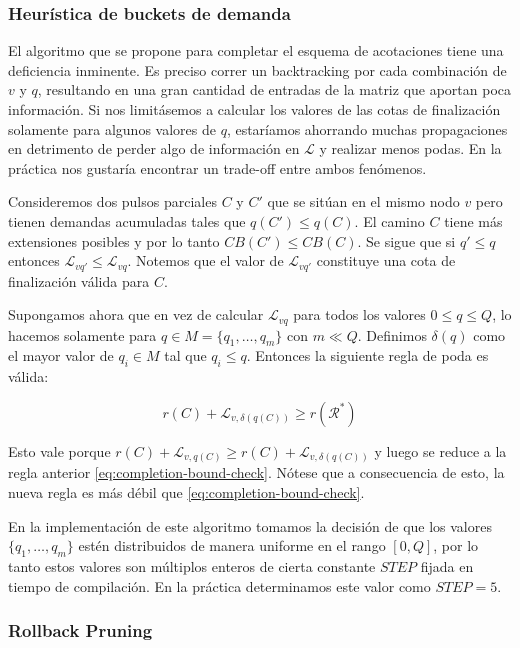 \subsubsection{Heurística de buckets de demanda}

El algoritmo que se propone para completar el esquema de acotaciones tiene una deficiencia inminente. Es preciso correr un backtracking por cada combinación de $v$ y $q$, resultando en una gran cantidad de entradas de la matriz que aportan poca información. Si nos limitásemos a calcular los valores de las cotas de finalización solamente para algunos valores de $q$, estaríamos ahorrando muchas propagaciones en detrimento de perder algo de información en $\mathscr{L}$ y realizar menos podas. En la práctica nos gustaría encontrar un trade-off entre ambos fenómenos.

Consideremos dos pulsos parciales $C$ y $C'$ que se sitúan en el mismo nodo $v$ pero tienen demandas acumuladas tales que $q(C') \leq q(C)$. El camino $C$ tiene más extensiones posibles y por lo tanto $CB(C') \leq CB(C)$. Se sigue que si $q' \leq q$ entonces $\mathscr{L}_{vq'} \leq \mathscr{L}_{vq}$. Notemos que el valor de $\mathscr{L}_{vq'}$ constituye una cota de finalización válida para $C$.

Supongamos ahora que en vez de calcular $\mathscr{L}_{vq}$ para todos los valores $0 \leq q \leq Q$, lo hacemos solamente para $q \in M = \{q_1, \dots, q_m\}$ con $m \ll Q$. Definimos $\delta(q)$ como el mayor valor de $q_i \in M$ tal que $q_i \leq q$. Entonces la siguiente regla de poda es válida:  

\begin{equation}
    r(C) + \mathscr{L}_{v, \delta(q(C))} \geq r(\mathscr{R}^{*})
\end{equation}

Esto vale porque $r(C) + \mathscr{L}_{v, q(C)} \geq r(C) + \mathscr{L}_{v, \delta(q(C))}$ y luego se reduce a la regla anterior \ref{eq:completion-bound-check}. Nótese que a consecuencia de esto, la nueva regla es más débil que \ref{eq:completion-bound-check}.

En la implementación de este algoritmo tomamos la decisión de que los valores $\{q_1, \dots, q_m\}$ estén distribuidos de manera uniforme en el rango $[0, Q]$, por lo tanto estos valores son múltiplos enteros de cierta constante $STEP$ fijada en tiempo de compilación. En la práctica determinamos este valor como $STEP = 5$. 


\subsubsection{Rollback Pruning}

